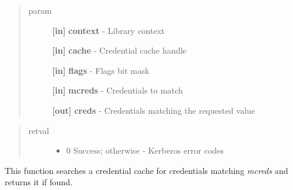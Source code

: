 \documentclass[letterpaper,10pt,english]{sphinxmanual}
\begin{document}
\begin{fulllineitems}
\label{appdev/refs/api/krb5_cc_retrieve_cred:c.krb5_cc_retrieve_cred}
\end{fulllineitems}

\begin{quote}\begin{description}
\item[{param}] \leavevmode
\textbf{{[}in{]}} \textbf{context} - Library context

\textbf{{[}in{]}} \textbf{cache} - Credential cache handle

\textbf{{[}in{]}} \textbf{flags} - Flags bit mask

\textbf{{[}in{]}} \textbf{mcreds} - Credentials to match

\textbf{{[}out{]}} \textbf{creds} - Credentials matching the requested value

\end{description}\end{quote}
\begin{quote}\begin{description}
\item[{retval}] \leavevmode\begin{itemize}
\item {} 
0   Success; otherwise - Kerberos error codes

\end{itemize}

\end{description}\end{quote}

This function searches a credential cache for credentials matching \emph{mcreds} and returns it if found.
\end{document}
